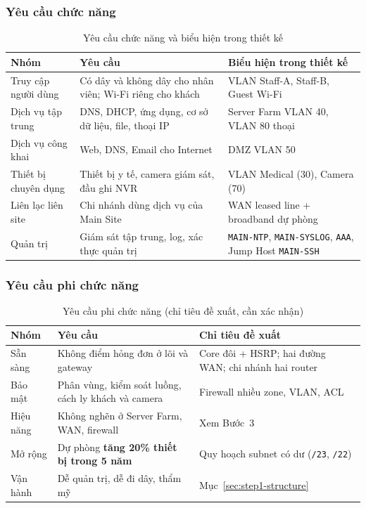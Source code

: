 \subsubsection{Yêu cầu chức năng}
\begin{small}
\setlength{\tabcolsep}{4pt}
\begin{longtable}{|p{3.0cm}|p{5.6cm}|p{5.2cm}|}
\caption{Yêu cầu chức năng và biểu hiện trong thiết kế} \label{tab:func_req} \\
\hline
\textbf{Nhóm} & \textbf{Yêu cầu} & \textbf{Biểu hiện trong thiết kế} \\ \hline
\endhead
Truy cập người dùng & Có dây và không dây cho nhân viên; Wi-Fi riêng cho khách & VLAN Staff-A, Staff-B, Guest Wi-Fi \\ \hline
Dịch vụ tập trung & DNS, DHCP, ứng dụng, cơ sở dữ liệu, file, thoại IP & Server Farm VLAN 40, VLAN 80 thoại \\ \hline
Dịch vụ công khai & Web, DNS, Email cho Internet & DMZ VLAN 50 \\ \hline
Thiết bị chuyên dụng & Thiết bị y tế, camera giám sát, đầu ghi NVR & VLAN Medical (30), Camera (70) \\ \hline
Liên lạc liên site & Chi nhánh dùng dịch vụ của Main Site & WAN leased line + broadband dự phòng \\ \hline
Quản trị & Giám sát tập trung, log, xác thực quản trị & \texttt{MAIN-NTP}, \texttt{MAIN-SYSLOG}, \texttt{AAA}, Jump Host \texttt{MAIN-SSH} \\ \hline
\end{longtable}
\end{small}

\subsubsection{Yêu cầu phi chức năng}
\begin{small}
\setlength{\tabcolsep}{4pt}
\begin{longtable}{|p{2.4cm}|p{5.2cm}|p{6.2cm}|}
\caption{Yêu cầu phi chức năng (chỉ tiêu đề xuất, cần xác nhận)} \label{tab:nonfunc_req} \\
\hline
\textbf{Nhóm} & \textbf{Yêu cầu} & \textbf{Chỉ tiêu đề xuất} \\ \hline
\endhead
Sẵn sàng & Không điểm hỏng đơn ở lõi và gateway & Core đôi + HSRP; hai đường WAN; chi nhánh hai router \\ \hline
Bảo mật & Phân vùng, kiểm soát luồng, cách ly khách và camera & Firewall nhiều zone, VLAN, ACL \\ \hline
Hiệu năng & Không nghẽn ở Server Farm, WAN, firewall & Xem Bước~3 \\ \hline
Mở rộng & Dự phòng \textbf{tăng 20\% thiết bị trong 5 năm} & Quy hoạch subnet có dư (\texttt{/23}, \texttt{/22}) \\ \hline
Vận hành & Dễ quản trị, dễ đi dây, thẩm mỹ & Mục~\ref{sec:step1-structure} \\ \hline
\end{longtable}
\end{small}

